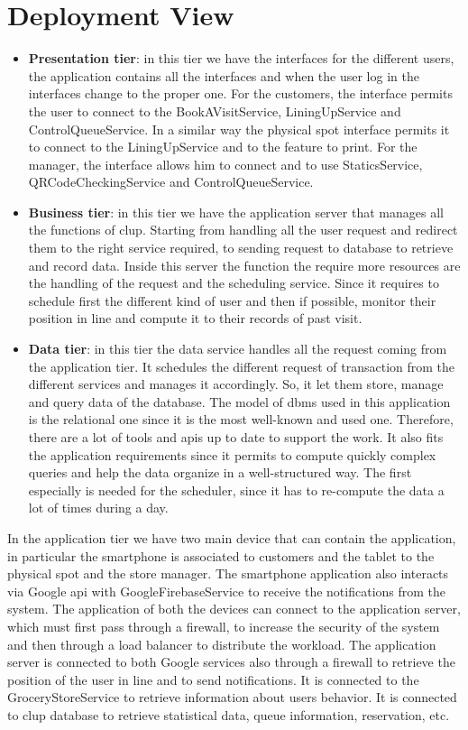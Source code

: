 \section{Deployment View}
\begin{itemize}
    \item \textbf{Presentation tier}: in this tier we have the interfaces for the different users, the application contains all the interfaces and when the user log in the interfaces change to the proper one. For the customers, the interface permits the user to connect to the BookAVisitService, LiningUpService and ControlQueueService. In a similar way the physical spot interface permits it to connect to the LiningUpService and to the feature to print. For the manager, the interface allows him to connect and to use StaticsService, QRCodeCheckingService and ControlQueueService.

    \item \textbf{Business tier}: in this tier we have the application server that manages all the functions of \gls{clup}. Starting from handling all the user request and redirect them to the right service required, to sending request to database to retrieve and record data. Inside this server the function the require more resources are the handling of the request and the scheduling service. Since it requires to schedule first the different kind of user and then if possible, monitor their position in line and compute it to their records of past visit.

    \item \textbf{Data tier}: in this tier the data service handles all the request coming from the application tier. It schedules the different request of transaction from the different services and manages it accordingly. So, it let them store, manage and query data of the database. The model of \gls{dbms} used in this application is the relational one since it is the most well-known and used one. Therefore, there are a lot of tools and \glspl{api} up to date to support the work. It also fits the application requirements since it permits to compute quickly complex queries and help the data organize in a well-structured way. The first especially is needed for the scheduler, since it has to re-compute the data a lot of times during a day.
\end{itemize}
In the application tier we have two main device that can contain the application, in particular the smartphone is associated to customers and the tablet to the physical spot and the store manager. The smartphone application also interacts via Google \gls{api} with GoogleFirebaseService to receive the notifications from the system. The application of both the devices can connect to the application server, which must first pass through a firewall, to increase the security of the system and then through a load balancer to distribute the workload.
The application server is connected to both Google services also through a firewall to retrieve the position of the user in line and to send notifications. It is connected to the GroceryStoreService to retrieve information about users behavior. It is connected to \gls{clup} database to retrieve statistical data, queue information, reservation, etc.


